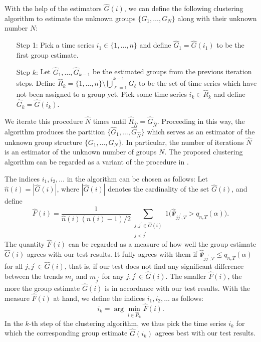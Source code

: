 \documentclass[a4paper,12pt]{article}
\numberwithin{equation}{section}
\begin{document}
With the help of the estimators $\widehat{G}(i)$, we can define the following clustering algorithm to estimate the unknown groups $\{G_1,\ldots,G_N\}$ along with their unknown number $N$:
\begin{itemize}[leftmargin=1.5cm]
\item[Step 1:] Pick a time series $i_1 \in \{1,\ldots,n\}$ and define $\widehat{G}_1 = \widehat{G}(i_1)$ to be the first group estimate.  
\item[Step $k$:] Let $\widehat{G}_1,\ldots,\widehat{G}_{k-1}$ be the estimated groups from the previous iteration steps. Define $\widehat{R}_k = \{1,\ldots,n\} \setminus \mathbin{\dot{\bigcup}}_{\ell=1}^{k-1} G_\ell$ to be the set of time series which have not been assigned to a group yet. Pick some time series $i_k \in \widehat{R}_k$ and define $\widehat{G}_k = \widehat{G}(i_k)$. 
\end{itemize}
We iterate this procedure $\widehat{N}$ times until $\widehat{R}_{\widehat{N}} = \widehat{G}_{\widehat{N}}$. Proceeding in this way, the algorithm produces the partition $\{ \widehat{G}_1,\ldots,\widehat{G}_{\widehat{N}} \}$ which serves as an estimator of the unknown group structure $\{ G_1,\ldots,G_N \}$. In particular, the number of iterations $\widehat{N}$ is an estimator of the unknown number of groups $N$. The proposed clustering algorithm can be regarded as a variant of the procedure in \cite{VogtLinton2017}. 


The indices $i_1,i_2,\ldots$ in the algorithm can be chosen as follows: Let $\widehat{n}(i) = |\widehat{G}(i)|$, where $|\widehat{G}(i)|$ denotes the cardinality of the set $\widehat{G}(i)$, and define
\[ \widehat{F}(i) = \frac{1}{\widehat{n}(i) (\widehat{n}(i) - 1)/2}\sum\limits_{\substack{j, j^\prime \in \widehat{G}(i) \\ j < j^\prime}} 1\big( \widehat{\Psi}_{jj^\prime,T} > q_{n,T}(\alpha) \big). \]
The quantity $\widehat{F}(i)$ can be regarded as a measure of how well the group estimate $\widehat{G}(i)$ agrees with our test results. It fully agrees with them if $\widehat{\Psi}_{jj^\prime,T} \le q_{n,T}(\alpha)$ for all $j,j^\prime \in \widehat{G}(i)$, that is, if our test does not find any significant difference between the trends $m_j$ and $m_{j^\prime}$ for any $j,j^\prime \in \widehat{G}(i)$. The smaller $\widehat{F}(i)$, the more the group estimate $\widehat{G}(i)$ is in accordance with our test results. With the measure $\widehat{F}(i)$ at hand, we define the indices $i_1,i_2,\ldots$ as follows: 
\[ i_k = \arg\min_{ i \in \widehat{R}_k} \widehat{F}(i). \]
In the $k$-th step of the clustering algorithm, we thus pick the time series $i_k$ for which the corresponding group estimate $\widehat{G}(i_k)$ agrees best with our test results. 
\end{document}
